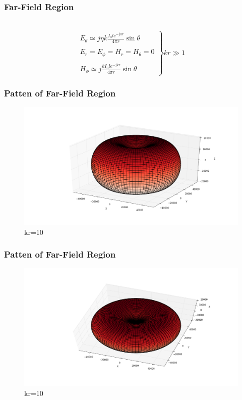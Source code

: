 \documentclass[compress=true]{beamer}
\begin{document}
\begin{frame}
  \frametitle{Far-Field Region}
  \begin{block}{~}
  \begin{equation}
    \left.
      \begin{array}{l}
        E_{\theta} \simeq j{\eta}k\frac{I_0le^{-jkr}}{4\pi r}\sin{\theta}\\\\
        E_r=E_{\phi}=H_r=H_{\theta}=0\\\\
        H_{\phi}\simeq j\frac{kI_0le^{-jkr}}{4\pi r}\sin{\theta}
      \end{array}
    \right\} kr\gg 1
  \end{equation}
  \end{block}
\end{frame}
\begin{frame}
  \frametitle{Patten of Far-Field Region}
  \begin{figure}
    \includegraphics[height=0.7\textheight]{far_kr_10_1.png}
    \caption*{\tiny{kr=10}}
  \end{figure}
\end{frame}
\begin{frame}
  \frametitle{Patten of Far-Field Region}
  \begin{figure}
    \includegraphics[height=0.7\textheight]{far_kr_10_2.png}
    \caption*{\tiny{kr=10}}
  \end{figure}
\end{frame}
\end{document}
